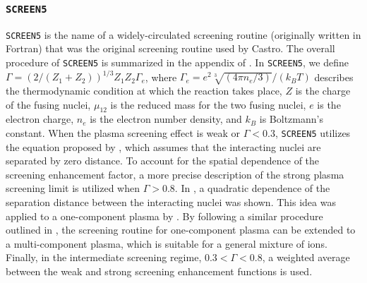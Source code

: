 \documentclass[preprint,times,tighten]{aastex631}
\newcommand{\castro}{{\sf Castro}}
\begin{document}


\subsubsection{{\tt SCREEN5}}

{\tt SCREEN5} is the name of a widely-circulated screening routine (originally written in Fortran) that was the original screening routine used by \castro.
The overall procedure of {\tt SCREEN5} is summarized in the appendix of \cite{Wallace:1982}. In {\tt SCREEN5}, we define $\Gamma = (2/(Z_1+Z_2))^{1/3}Z_1 Z_2 \Gamma_e$, where $\Gamma_e = e^2\sqrt[3]{(4\pi n_e/3)}/(k_BT)$ describes the thermodynamic condition at which the reaction takes place, $Z$ is the charge of the fusing nuclei, $\mu_{12}$ is the reduced mass for the two fusing nuclei, $e$ is the electron charge, $n_e$ is the electron number density, and $k_B$ is Boltzmann's constant. When the plasma screening effect is weak or $\Gamma < 0.3$, {\tt SCREEN5} utilizes the equation proposed by \cite{Graboske_1973, Dewitt_1973}, which assumes that the interacting nuclei are separated by zero distance. To account for the spatial dependence of the screening enhancement factor, a more precise description of the strong plasma screening limit is utilized when $\Gamma > 0.8$. In \cite{jancovici:1977}, a quadratic dependence of the separation distance between the interacting nuclei was shown. This idea was applied to a one-component plasma by \cite{alastuey:1978}. By following a similar procedure outlined in \cite{itoh:1979}, the screening routine for one-component plasma can be extended to a multi-component plasma, which is suitable for a general mixture of ions. Finally, in
the intermediate screening regime, $0.3 < \Gamma < 0.8$, a weighted average between the weak and strong screening enhancement functions is used.





\end{document}
